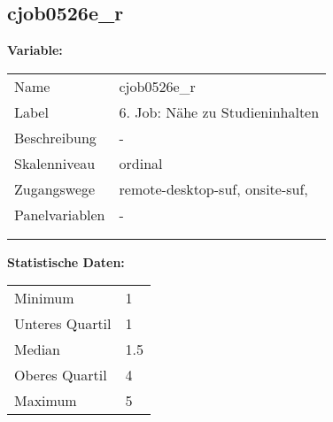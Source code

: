 	
	
	\subsection{cjob0526e\_r}
	\label{subSection:cjob0526e_r}

	\noindent\textbf{Variable:}\\
		\begin{tabular}{lL{11.3cm}}
			\label{tableVariable:cjob0526e_r}
			Name & cjob0526e\_r \\
			Label & 6. Job: Nähe zu Studieninhalten \\
			Beschreibung & - \\
			Skalenniveau & ordinal \\
			Zugangswege &
				remote-desktop-suf,
				onsite-suf,
 \\
			Panelvariablen & -
			 \\
			 \\
 \\
		\end{tabular}



		\vspace*{1 cm}
		\noindent\textbf{Statistische Daten:}\\
			\begin{tabular}{ll}
				\label{tableStatistics:cjob0526e_r}
					Minimum & 1 \\
					Unteres Quartil & 1 \\
					Median & 1.5 \\
					Oberes Quartil & 4 \\
					Maximum & 5 \\
			\end{tabular}



